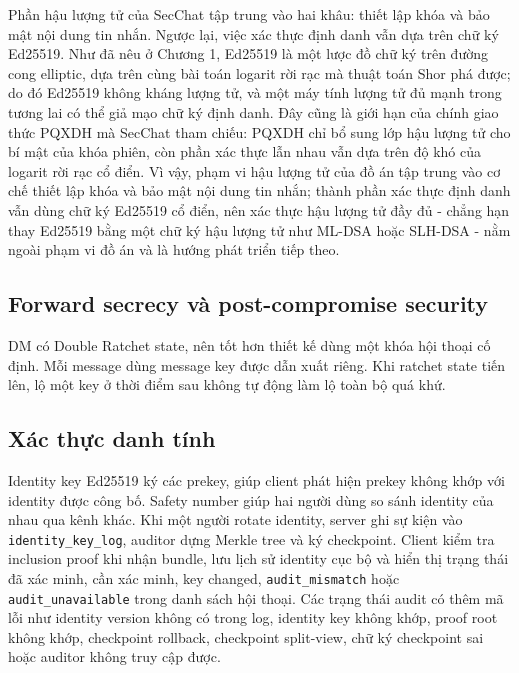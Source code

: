 Phần hậu lượng tử của SecChat tập trung vào hai khâu: thiết lập khóa và bảo mật nội dung tin nhắn. Ngược lại, việc xác thực định danh vẫn dựa trên chữ ký Ed25519. Như đã nêu ở Chương 1, Ed25519 là một lược đồ chữ ký trên đường cong elliptic, dựa trên cùng bài toán logarit rời rạc mà thuật toán Shor phá được; do đó Ed25519 không kháng lượng tử, và một máy tính lượng tử đủ mạnh trong tương lai có thể giả mạo chữ ký định danh. Đây cũng là giới hạn của chính giao thức PQXDH mà SecChat tham chiếu: PQXDH chỉ bổ sung lớp hậu lượng tử cho bí mật của khóa phiên, còn phần xác thực lẫn nhau vẫn dựa trên độ khó của logarit rời rạc cổ điển. Vì vậy, phạm vi hậu lượng tử của đồ án tập trung vào cơ chế thiết lập khóa và bảo mật nội dung tin nhắn; thành phần xác thực định danh vẫn dùng chữ ký Ed25519 cổ điển, nên xác thực hậu lượng tử đầy đủ - chẳng hạn thay Ed25519 bằng một chữ ký hậu lượng tử như ML-DSA hoặc SLH-DSA - nằm ngoài phạm vi đồ án và là hướng phát triển tiếp theo.

\subsection{Forward secrecy và post-compromise security}

DM có Double Ratchet state, nên tốt hơn thiết kế dùng một khóa hội thoại cố định. Mỗi message dùng message key được dẫn xuất riêng. Khi ratchet state tiến lên, lộ một key ở thời điểm sau không tự động làm lộ toàn bộ quá khứ.

\subsection{Xác thực danh tính}

Identity key Ed25519 ký các prekey, giúp client phát hiện prekey không khớp với identity được công bố. Safety number giúp hai người dùng so sánh identity của nhau qua kênh khác. Khi một người rotate identity, server ghi sự kiện vào \texttt{identity\_key\_log}, auditor dựng Merkle tree và ký checkpoint. Client kiểm tra inclusion proof khi nhận bundle, lưu lịch sử identity cục bộ và hiển thị trạng thái đã xác minh, cần xác minh, key changed, \texttt{audit\_mismatch} hoặc \texttt{audit\_unavailable} trong danh sách hội thoại. Các trạng thái audit có thêm mã lỗi như identity version không có trong log, identity key không khớp, proof root không khớp, checkpoint rollback, checkpoint split-view, chữ ký checkpoint sai hoặc auditor không truy cập được.

